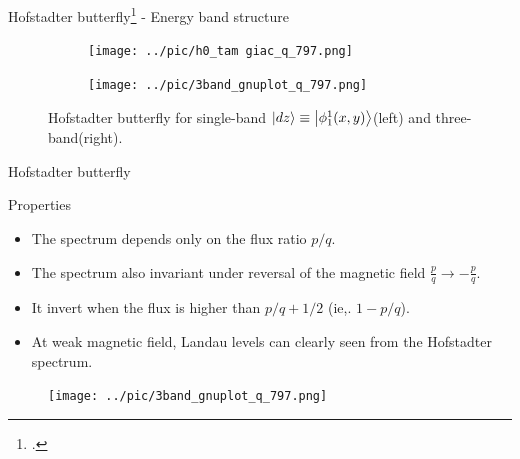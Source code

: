 \documentclass[aspectratio=169,compress,x11names]{beamer}
\begin{document}
	\begin{frame}{Hofstadter butterfly\footcite{PhysRevB.14.2239} - Energy band structure}
		\begin{figure}
			\centering
			\begin{subfigure}[b]{0.495\textwidth}
				\centering
				\texttt{[image: ../pic/h0\_tam giac\_q\_797.png]}
				\label{fig:3 band}
			\end{subfigure}
			\hspace{-3\baselineskip}
			\begin{subfigure}[b]{0.495\textwidth}
				\centering
				\texttt{[image: ../pic/3band\_gnuplot\_q\_797.png]}
				\label{fig:1 band}
			\end{subfigure}
			\caption{
				Hofstadter butterfly for single-band $\ket{dz} \equiv \ket{\phi_{1}^{1}(x,y)}$(left) and three-band(right). 
			}
		\end{figure}
	\end{frame}
 	\begin{frame}{Hofstadter butterfly}
		\begin{multicols}{2}
			\begin{minipage}{\columnwidth}
				\begin{block}{Properties}
					\begin{itemize}
						\item The spectrum depends only on the flux ratio $p/q$.
						\item The spectrum also invariant under reversal of the magnetic field $\tfrac{p}{q} \to -\tfrac{p}{q}$.
						\item It invert when the flux is higher than $p/q + 1/2$ (ie,. $1-p/q$).
						\item At weak magnetic field, Landau levels can clearly seen from the Hofstadter spectrum.
					\end{itemize}
				\end{block}
			\end{minipage}
			\begin{minipage}{\columnwidth}
				\begin{figure}
					\centering
					\texttt{[image: ../pic/3band\_gnuplot\_q\_797.png]}
				\end{figure}
			\end{minipage}
		\end{multicols}
	\end{frame}
\end{document}
